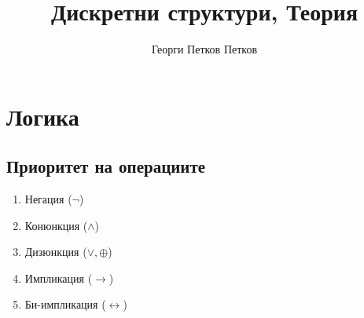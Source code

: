 \documentclass[12pt]{article}
\title{Дискретни структури, Теория}
\author{Георги Петков Петков}
\date{}
\begin{document}
    \maketitle
    \section{Логика}
    \subsection*{Приоритет на операциите}
    \begin{enumerate}
        \item Негация ($ \neg $)
        \item Конюнкция ($ \land $)
        \item Дизюнкция ($ \lor, \oplus $)
        \item Импликация ($ \rightarrow $)
        \item Би-импликация ($ \leftrightarrow $)
    \end{enumerate}
\end{document}
